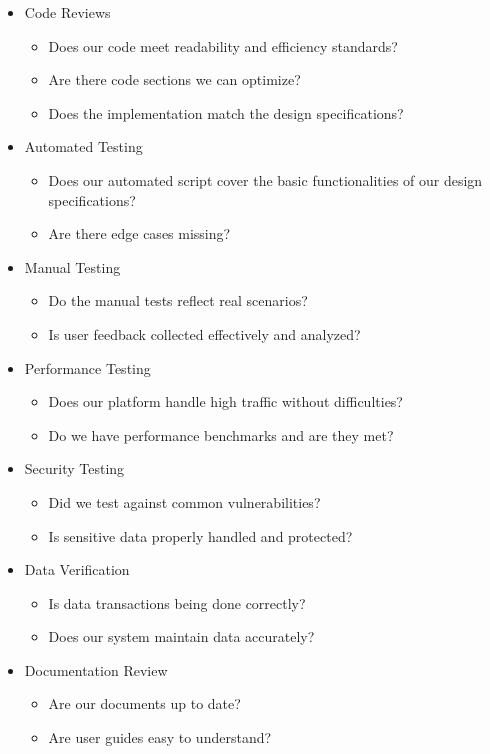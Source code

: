 \documentclass[12pt, titlepage]{article}
\begin{document}
\begin{itemize}
    \item Code Reviews 
        \begin{itemize}
            \item Does our code meet readability and efficiency standards?
            \item Are there code sections we can optimize?
            \item Does the implementation match the design specifications?
        \end{itemize}
    \item Automated Testing
        \begin{itemize}
            \item Does our automated script cover the basic functionalities of our design specifications?
            \item Are there edge cases missing?
        \end{itemize}
    \item Manual Testing
        \begin{itemize}
            \item Do the manual tests reflect real scenarios?
            \item Is user feedback collected effectively and analyzed?
        \end{itemize}
    \item Performance Testing
        \begin{itemize}
            \item Does our platform handle high traffic without difficulties?
            \item Do we have performance benchmarks and are they met?
        \end{itemize}
    \item Security Testing
        \begin{itemize}
            \item Did we test against common vulnerabilities?
            \item Is sensitive data properly handled and protected?
        \end{itemize}
    \item Data Verification
        \begin{itemize}
            \item Is data transactions being done correctly?
            \item Does our system maintain data accurately?
        \end{itemize}
    \item Documentation Review
        \begin{itemize}
            \item Are our documents up to date?
            \item Are user guides easy to understand?
        \end{itemize}
\end{itemize}
\end{document}
